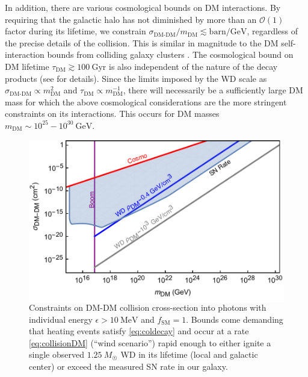 \documentclass[twocolumn, preprintnumbers,amsmath,amssymb,prd, superscriptaddress]{revtex4}
\newcommand{\OO}{\mathcal{O}}
\newcommand{\GeV}{\text{GeV}}
\begin{document}
In addition, there are various cosmological bounds on DM interactions.
By requiring that the galactic halo has not diminished by more than an $\OO(1)$ factor during its lifetime, we constrain $\sigma_\text{DM-DM}/m_\text{DM} \lesssim \text{barn}/\GeV$, regardless of the precise details of the collision.
This is similar in magnitude to the DM self-interaction bounds from colliding galaxy clusters \cite{Randall:2007ph}.
The cosmological bound on DM lifetime $\tau_\text{DM} \gtrsim 100 ~\text{Gyr}$ is also independent of the nature of the decay products (see \cite{Poulin:2016nat} for details).
Since the limits imposed by the WD scale as $\sigma_\text{DM-DM} \propto m_\text{DM}^2$ and $\tau_\text{DM} \propto m_\text{DM}^{-1}$, there will necessarily be a sufficiently large DM mass for which the above cosmological considerations are the more stringent constraints on its interactions.
This occurs for DM masses $m_\text{DM} \sim 10^{25} - 10^{30} ~\GeV$.


\begin{figure}
\includegraphics[scale=.45]{collisionobservation.pdf}
\caption{Constraints on DM-DM collision cross-section into photons with individual energy $\epsilon > 10~\text{MeV}$ and $f_\text{SM} = 1$. Bounds come demanding that heating events satisfy \eqref{eq:coldecay} and occur at a rate \eqref{eq:collisionDM} (``wind scenario'') rapid enough to either ignite a single observed $1.25~M_{\astrosun}$ WD in its lifetime (local and galactic center) or exceed the measured SN rate in our galaxy.}
\label{fig:collisionclasses}
\end{figure}
\end{document}
